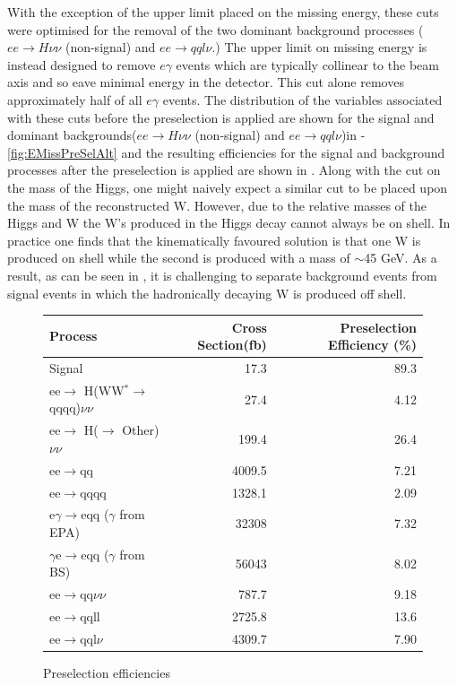 With the exception of the upper limit placed on the missing energy, these cuts were optimised for the removal of the two dominant background processes ($ee\rightarrow H\nu\nu$ (non-signal) and $ee\rightarrow qql\nu$.) The upper limit on missing energy is instead designed to remove $e\gamma$ events which are typically collinear to the beam axis and so eave minimal energy in the detector. This cut alone removes approximately half of all $e\gamma$ events. The distribution of the variables associated with these cuts before the preselection is applied are shown for the signal and dominant backgrounds($ee\rightarrow H\nu\nu$ (non-signal) and $ee\rightarrow qql\nu$)in -\ref{fig:EMissPreSelAlt} and the resulting efficiencies for the signal and background processes after the preselection is applied are shown in . Along with the cut on the mass of the Higgs, one might naively expect a similar cut to be placed upon the mass of the reconstructed W. However, due to the relative masses of the Higgs and W the W's produced in the Higgs decay cannot always be on shell. In practice one finds that the kinematically favoured solution is that one W is produced on shell while the second is produced with a mass of $\sim$45 GeV. As a result, as can be seen in , it is challenging to separate background events from signal events in which the hadronically decaying W is produced off shell.

\begin{figure}
  \centering
  \begin{tabular}{l r r }
   \toprule
    Process & Cross Section(fb) & Preselection Efficiency (\%)     \\
    \midrule
    Signal             & 17.3    &   89.3 \\ 
    \midrule
    ee$\rightarrow$ H(WW$^*\rightarrow$qqqq)$\nu\nu$  & 27.4    &  4.12  \\
    \midrule
    ee$\rightarrow$ H($\rightarrow$ Other)$\nu\nu$ & 199.4 & 26.4  \\
    \midrule
    ee$\rightarrow$qq               & 4009.5    &  7.21 \\ 
    \midrule
    ee$\rightarrow$qqqq               & 1328.1    &  2.09  \\ 
    \midrule
    e$\gamma$$\rightarrow$eqq ($\gamma$ from EPA)                 & 32308    & 7.32   \\ 
    \midrule
    $\gamma$e$\rightarrow$eqq ($\gamma$ from BS)               &  56043   &  8.02 \\ 
    \midrule
    ee$\rightarrow$qq$\nu\nu$               & 787.7    & 9.18  \\ 
    \midrule
    ee$\rightarrow$qqll               & 2725.8    &   13.6 \\ 
    \midrule
    ee$\rightarrow$qql$\nu$              & 4309.7    &  7.90  \\ 
    \bottomrule
  \end{tabular}
  \caption[Preselection efficiencies]{Preselection efficiencies}
  \label{fig:preseleff}
\end{figure}



